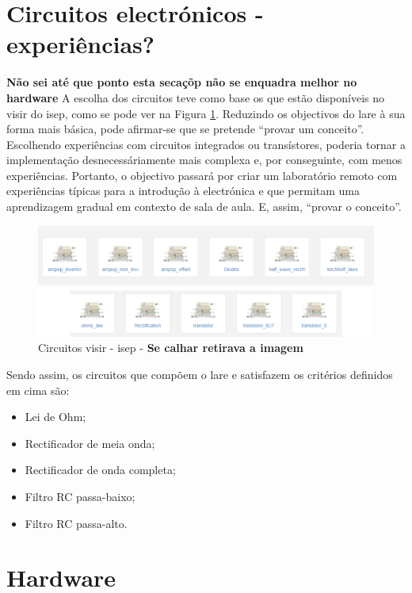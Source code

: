 \section{Circuitos electrónicos - experiências?}
\label{sec:circuitos}
\textbf{Não sei até que ponto esta secaçõp não se enquadra melhor no hardware}
A escolha dos circuitos teve como base os que estão disponíveis no \acrshort{visir} do \acrshort{isep}, como se pode ver na Figura \ref{fig:circuitosvisir}. Reduzindo os objectivos do \acrshort{lare} à sua forma mais básica, pode afirmar-se que se pretende ``provar um conceito''. Escolhendo experiências com circuitos integrados ou transístores, poderia tornar a implementação desnecessáriamente mais complexa e, por conseguinte, com menos experiências. Portanto, o objectivo passará por criar um \acrshort{laboratório remoto} com experiências típicas para a introdução à electrónica e que permitam uma aprendizagem gradual em contexto de sala de aula. E, assim, ``provar o conceito''.

\begin{figure}[hbtp]
    \centering
    \includegraphics[width=1\textwidth]{figures/visir_ISEP.png}
    \caption{Circuitos \acrshort{visir} - \acrshort{isep} - \textbf{Se calhar retirava a imagem}}
    \label{fig:circuitosvisir}
\end{figure}

Sendo assim, os circuitos que compõem o \acrshort{lare} e satisfazem os critérios definidos em cima são:
\begin{itemize}
    \item Lei de Ohm;
    \item Rectificador de meia onda;
    \item Rectificador de onda completa;
    \item Filtro RC passa-baixo;
    \item Filtro RC passa-alto.
\end{itemize}

\section{Hardware}
\label{sec:hardware}
